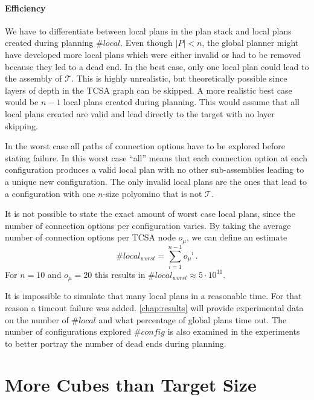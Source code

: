 \paragraph{Efficiency}

We have to differentiate between local plans in the plan stack and local plans created during planning $\#\textit{local}$.
Even though $|P| < n$, the global planner might have developed more local plans which were either invalid or had to be removed because they led to a dead end.
In the best case, only one local plan could lead to the assembly of $\mathcal{T}$.
This is highly unrealistic, but theoretically possible since layers of depth in the TCSA graph can be skipped.
A more realistic best case would be $n-1$ local plans created during planning. 
This would assume that all local plans created are valid and lead directly to the target with no layer skipping.

In the worst case all paths of connection options have to be explored before stating failure.
In this worst case ``all'' means that each connection option at each configuration produces a valid local plan with no other sub-assemblies leading to a unique new configuration.
The only invalid local plans are the ones that lead to a configuration with one $n$-size polyomino that is not $\mathcal{T}$.

It is not possible to state the exact amount of worst case local plans, since the number of connection options per configuration varies.
By taking the average number of connection options per TCSA node $o_\mu$, we can define an estimate
\begin{equation}
\#\textit{local}_\textit{worst} = \sum_{i=1}^{n-1} {o_\mu}^i \, .
\end{equation} 
For $n = 10$ and $o_\mu = 20$ this results in $\#\textit{local}_\textit{worst} \approx 5 \cdot 10^{11}$.

It is impossible to simulate that many local plans in a reasonable time.
For that reason a timeout failure was added.
\autoref{chap:results} will provide experimental data on the number of $\#\textit{local}$ and what percentage of global plans time out.
The number of configurations explored $\#\textit{config}$ is also examined in the experiments to better portray the number of dead ends during planning.


\section{More Cubes than Target Size}
\label{sec:more_cubes}

